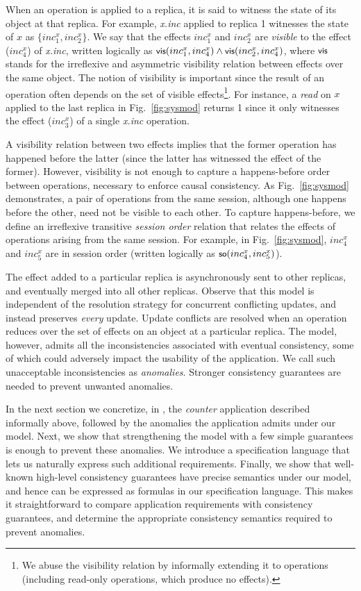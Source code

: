 When an operation is applied to a replica, it is said to witness the
state of its object at that replica.  For example, \emph{x.inc}
applied to replica 1 witnesses the state of $x$ as
$\{inc^x_1,inc^x_2\}$.  We say that the effects $inc^x_1$ and
$inc^x_2$ are \emph{visible} to the effect ($inc^x_4$) of
\emph{x.inc}, written logically as $\small {\normalfont \textsf{vis}(inc^x_1,inc^x_4)}
\wedge {\normalfont \textsf{vis}(inc^x_2,inc^x_4)}$, where $\small {\normalfont \textsf{vis}}$ stands for the
irreflexive and asymmetric visibility relation between effects over
the same object. The notion of visibility is important since the
result of an operation often depends on the set of visible
effects\footnote{We abuse the visibility relation by informally
  extending it to operations (including read-only operations, which
  produce no effects).}. For instance, a \emph{read} on $x$ applied to
the last replica in Fig.~\ref{fig:sysmod} returns 1 since it only
witnesses the effect ($inc^x_3$) of a single \emph{x.inc} operation.

A visibility relation between two effects implies that the former
operation has happened before the latter (since the latter has
witnessed the effect of the former). However, visibility is not enough
to capture a happens-before order between operations, necessary to
enforce causal consistency. As Fig.~\ref{fig:sysmod} demonstrates, a
pair of operations from the same session, although one happens before
the other, need not be visible to each other. To capture
happens-before, we define an irreflexive transitive \emph{session
  order} relation that relates the effects of operations arising from
the same session. For example, in Fig.~\ref{fig:sysmod}, $inc^x_4$ and
$inc^x_5$ are in session order (written logically as $\small
{\normalfont \textsf{so}(inc^x_4,inc^x_5)}$).

The effect added to a particular replica is asynchronously sent to
other replicas, and eventually merged into all other replicas. Observe
that this model is independent of the resolution strategy for
concurrent conflicting updates, and instead preserves \emph{every}
update. Update conflicts are resolved when an operation reduces over
the set of effects on an object at a particular replica. The model,
however, admits all the inconsistencies associated with eventual
consistency, some of which could adversely impact the usability of the
application. We call such unacceptable inconsistencies as
\emph{anomalies}. Stronger consistency guarantees are needed to
prevent unwanted anomalies.

In the next section we concretize, in \name, the \emph{counter}
application described informally above, followed by the anomalies the
application admits under our model.  Next, we show that strengthening
the model with a few simple guarantees is enough to prevent these
anomalies. We introduce a specification language that lets us
naturally express such additional requirements. Finally, we show that
well-known high-level consistency guarantees have precise semantics
under our model, and hence can be expressed as formulas in our
specification language. This makes it straightforward to compare
application requirements with consistency guarantees, and determine
the appropriate consistency semantics required to prevent anomalies.

